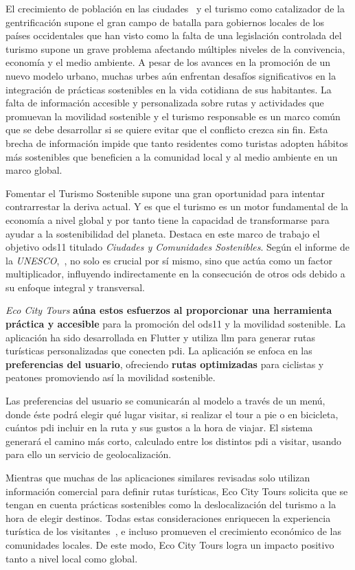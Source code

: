 
El crecimiento de población en las ciudades~\cite{nieuwenhuijsen_urban_2020} y el turismo como catalizador de la gentrificación supone el gran campo de batalla para gobiernos locales de los países occidentales que han visto como la falta de una legislación controlada del turismo supone un grave problema afectando múltiples niveles de la convivencia, economía y el medio ambiente. A pesar de los avances en la promoción de un nuevo modelo urbano, muchas urbes aún enfrentan desafíos significativos en la integración de prácticas sostenibles en la vida cotidiana de sus habitantes. La falta de información accesible y personalizada sobre rutas y actividades que promuevan la movilidad sostenible y el turismo responsable es un marco común que se debe desarrollar si se quiere evitar que el conflicto crezca sin fin. Esta brecha de información impide que tanto residentes como turistas adopten hábitos más sostenibles que beneficien a la comunidad local y al medio ambiente en un marco global.

Fomentar el Turismo Sostenible supone una gran oportunidad para intentar contrarrestar la deriva actual. Y es que el turismo es un motor fundamental de la economía a nivel global y por tanto tiene la capacidad de transformarse para ayudar a la sostenibilidad del planeta.  Destaca en este marco de trabajo el  objetivo \acrfull{ods11} titulado \textit{Ciudades y Comunidades Sostenibles}. Según el informe de la \textit{UNESCO},~\cite{ionescu_progress_2024}, no solo es crucial por sí mismo, sino que actúa como un factor multiplicador, influyendo indirectamente en la consecución de otros \acrshort{ods} debido a su enfoque integral y transversal.

\textit{Eco City Tours} \textbf{aúna estos esfuerzos al proporcionar una herramienta práctica y accesible} para la promoción del \acrshort{ods11} y la movilidad sostenible. La aplicación ha sido desarrollada en Flutter y utiliza \acrfull{llm} para generar rutas turísticas personalizadas que conecten \acrfull{pdi}. La aplicación se enfoca en las \textbf{preferencias del usuario}, ofreciendo \textbf{rutas optimizadas} para ciclistas y peatones promoviendo así la movilidad sostenible.

Las preferencias del usuario se comunicarán al modelo a través de un menú, donde éste podrá elegir qué lugar visitar, si realizar el tour a pie o en bicicleta, cuántos \acrlong{pdi} incluir en la ruta y sus gustos a la hora de viajar. El sistema generará el camino más corto, calculado entre los distintos \acrshort{pdi} a visitar, usando para ello un servicio de geolocalización.

Mientras que muchas de las aplicaciones similares revisadas solo utilizan información comercial para definir rutas turísticas, Eco City Tours solicita que se tengan en cuenta prácticas sostenibles como la deslocalización del turismo a la hora de elegir destinos. Todas estas consideraciones enriquecen la experiencia turística de los visitantes~\cite{mitas_tell_2023}, e incluso promueven el crecimiento económico de las comunidades locales. De este modo, Eco City Tours logra un impacto positivo tanto a nivel local como global.